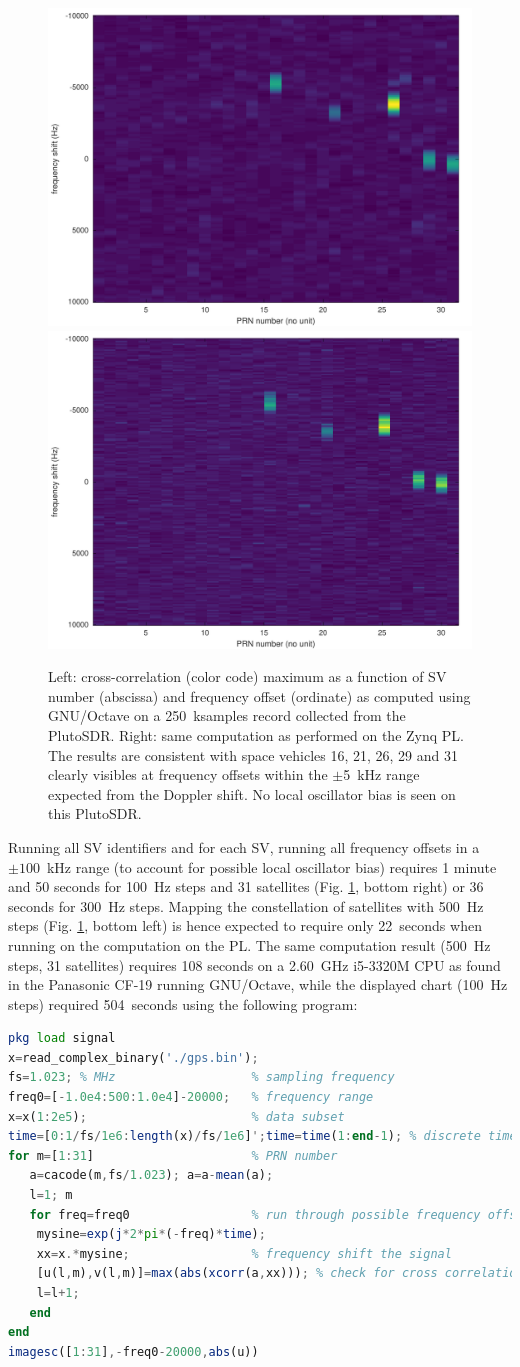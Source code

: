 \documentclass{article}
\begin{document}
\begin{figure}[h!tb]
\includegraphics[width=.49\linewidth]{190524gps_xcorr/gps_bin100Hz.pdf}
\includegraphics[width=.49\linewidth]{190524gps_xcorr/gps_plutosdr.pdf}
\caption{Left: cross-correlation (color code) maximum as a function of SV number (abscissa) and frequency
offset (ordinate) as computed using GNU/Octave on a 250~ksamples record collected from the
PlutoSDR. Right: same computation as performed on the Zynq PL. The results are consistent with space
vehicles 16, 21, 26, 29 and 31 clearly visibles at frequency offsets within the $\pm$5~kHz range expected
from the Doppler shift. No local oscillator bias is seen on this PlutoSDR.}
\label{f5}
\end{figure}

Running all SV identifiers and for each SV, running all frequency offsets in a $\pm 100$~kHz range (to account
for possible local oscillator bias) requires 1 minute and 50 seconds for 100~Hz steps and 31 satellites
(Fig. \ref{f5}, bottom right) or 36 seconds for 300~Hz steps. Mapping the constellation of satellites
with 500~Hz steps (Fig. \ref{f5}, bottom left) is hence expected to require only 22~seconds when running on
the computation on the PL. The same computation result (500~Hz steps, 31 satellites) requires 108 seconds
on a 2.60~GHz i5-3320M CPU as found in the Panasonic CF-19 running GNU/Octave, while the displayed chart
(100~Hz steps) required 504~seconds using the following program:
\begin{lstlisting}[language=octave]
pkg load signal
x=read_complex_binary('./gps.bin');
fs=1.023; % MHz                   % sampling frequency
freq0=[-1.0e4:500:1.0e4]-20000;   % frequency range
x=x(1:2e5);                       % data subset
time=[0:1/fs/1e6:length(x)/fs/1e6]';time=time(1:end-1); % discrete time
for m=[1:31]                      % PRN number
   a=cacode(m,fs/1.023); a=a-mean(a);
   l=1; m
   for freq=freq0                 % run through possible frequency offsets
    mysine=exp(j*2*pi*(-freq)*time); 
    xx=x.*mysine;                 % frequency shift the signal
    [u(l,m),v(l,m)]=max(abs(xcorr(a,xx))); % check for cross correlation max.
    l=l+1;
   end
end
imagesc([1:31],-freq0-20000,abs(u))
\end{lstlisting}
\end{document}
